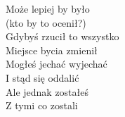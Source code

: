 \begin{text}
\begin{footTwelve}
    \vin Może lepiej by było\\
    \vin (kto by to ocenił?)\\
    \vin Gdybyś rzucił to wszystko\\
    \vin Miejsce bycia zmienił\\
    \vin Mogłeś jechać wyjechać\\
    \vin I stąd się oddalić\\
    \vin Ale jednak zostałeś\\
    \vin Z tymi co zostali
\end{footTwelve}
\end{text}
\begin{chord}

\end{chord}